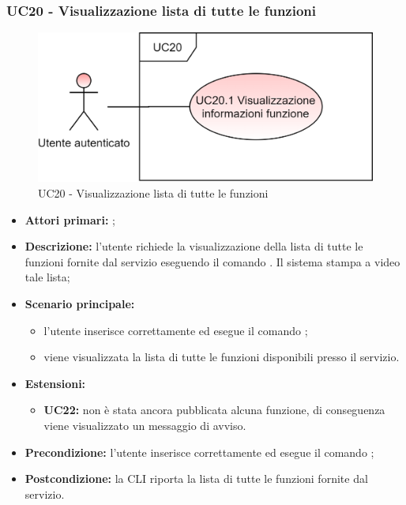 \subsubsection{UC20 - Visualizzazione lista di tutte le funzioni}
\begin{figure}[H]
	\centering
	\includegraphics[scale=\ucs]{./res/img/UC20.png}
	\caption {UC20 -  Visualizzazione lista di tutte le funzioni}
\end{figure}
\begin{itemize}
	\item \textbf{Attori primari:} \ua{};
	\item \textbf{Descrizione:} l’utente richiede la visualizzazione della lista di tutte le funzioni fornite dal servizio eseguendo il comando \lista{}. Il sistema stampa a video tale lista; 
	\item \textbf{Scenario principale:} 
	\begin{itemize}
		\item l'utente inserisce correttamente ed esegue il comando \lista{}; 
		\item viene visualizzata la lista di tutte le funzioni disponibili presso il servizio.
	\end{itemize}
	\item \textbf{Estensioni:} 
	\begin{itemize}
		\item \textbf{UC22:} non è stata ancora pubblicata alcuna funzione, di conseguenza viene visualizzato un messaggio di avviso. 
	\end{itemize}
	\item \textbf{Precondizione:} l'utente inserisce correttamente ed esegue il comando \lista{};
	\item \textbf{Postcondizione:} la CLI riporta la lista di tutte le funzioni fornite dal servizio.
\end{itemize}